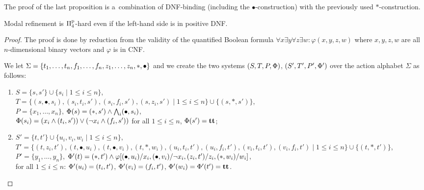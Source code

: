 The proof of the last proposition is a~combination of DNF-binding (including
the $\bullet$-construction) with the previously used $*$-construction.

\begin{proposition}\label{p:ld}
Modal refinement is $\mathrm\Pi^\mathrm p_4$-hard even if the left-hand side is in positive DNF.
\end{proposition}

\begin{proof}
The proof is done by reduction from the validity of the quantified
Boolean formula
 $\forall x \exists y \forall z \exists w : \varphi(x,y,z,w)$ where
 $x,y,z,w$ are all $n$-dimensional binary vectors and $\varphi$ is in CNF.

We let
$\mathrm{\Sigma} = \{t_1, \ldots, t_n, f_1, \ldots, f_n, 
        z_1, \ldots, z_n, *, \bullet \}$
and we create the two systems 
$(S,T,P,\mathrm{\Phi})$, $(S',T',P',\mathrm{\Phi}')$ over the
action alphabet $\Sigma$
as follows:
\begin{enumerate}
    \item $S = \{s,s'\} \cup \{s_i \mid 1 \le i \le n\}$,\\
$T = \{(s,\bullet,s_i), (s_i,t_i,s'), (s_i,f_i,s'),
(s,z_i,s') \mid 1 \le i \le n\} \cup \{(s,*,s')\}$,\\
$P = \{ x_1, \ldots, x_n \}$, 
$\mathrm{\Phi}(s) = (*,s') \wedge \bigwedge_i (\bullet,s_i)$,\\
$\mathrm{\Phi}(s_i) = (x_i \wedge (t_i,s')) \vee (\neg x_i \wedge (f_i,s'))$
for all $1 \le i \le n$,
$\mathrm{\Phi}(s') = \mathbf{tt}$;
\item 
$S' = \{t, t'\} \cup \{u_i, v_i, w_i \mid 1 \le i \le n\}$,\\
$T' = \{(t,z_i,t'), (t,\bullet,u_i), (t,\bullet,v_i),\allowbreak
(t,*,w_i), \allowbreak(u_i,t_i,t'), (u_i,f_i,t'), (v_i,t_i,t'),
\allowbreak
(v_i,f_i,t') \mid 1 \le i \le n\} \cup \{(t,*,t')\}$,\\
$P' = \{ y_1, \ldots, y_n \}$,
$\mathrm{\Phi}'(t) = (*,t') \wedge \allowbreak \varphi[(\bullet,u_i)/x_i,
        (\bullet,v_i)/\neg x_i,
        (z_i,t')/z_i,
        (*,w_i)/w_i]$,
\\for all $1 \le i \le n$: $\mathrm{\Phi}'(u_i) = (t_i,t')$,
$\mathrm{\Phi}'(v_i) = (f_i,t')$,
$\mathrm{\Phi}'(w_i) = \mathrm{\Phi}'(t') = \mathbf{tt}$.



\end{enumerate}
\end{proof}

